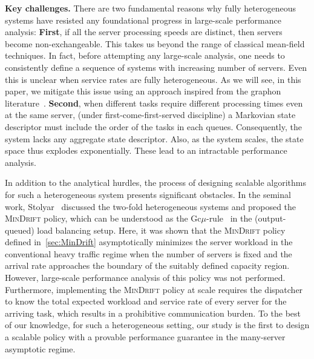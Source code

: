\documentclass[11pt, reqno]{article}
\numberwithin{equation}{section}
\numberwithin{theorem}{section}
\begin{document}
\noindent
\textbf{Key challenges.} 
There are two fundamental reasons why fully heterogeneous systems have resisted any foundational progress in large-scale performance analysis:
\textbf{First}, if all the server processing speeds are distinct, then servers become non-exchangeable.
This takes us beyond the range of classical mean-field techniques. In fact, before attempting any large-scale analysis, one needs to consistently define a sequence of systems with increasing number of servers. Even this is unclear when service rates are fully heterogeneous.
As we will see, in this paper, we mitigate this issue using an approach inspired from the graphon literature~\cite{ll12}.
\textbf{Second}, when different tasks require different processing times even at the same server,
(under first-come-first-served discipline) a Markovian state descriptor must include the order of the tasks in each queues. Consequently, the system lacks any aggregate state descriptor.
Also, as the system scales, the state space thus explodes exponentially. These lead to an intractable performance analysis.



In addition to the analytical hurdles, the process of designing scalable algorithms for such a heterogeneous system presents significant obstacles.
In the seminal work, Stolyar~\cite{AS05} discussed the two-fold heterogeneous systems and proposed the \textsc{MinDrift} policy, which can be understood as the Gc$\mu$-rule~\cite[Section~4]{MS04} in the (output-queued) load balancing setup. 
Here, it was shown that the \textsc{MinDrift} policy defined in~\ref{sec:MinDrift} asymptotically minimizes the server workload in the conventional heavy traffic regime when the number of servers is fixed and the arrival rate approaches the boundary of the suitably defined capacity region. 
However, large-scale performance analysis of this policy was not performed. 
Furthermore, implementing the \textsc{MinDrift} policy at scale requires the dispatcher to know the total expected workload and service rate of every server for the arriving task, which results in a prohibitive communication burden. 
To the best of our knowledge, for such a heterogeneous setting, our study is the first to design a scalable policy with a provable performance guarantee in the many-server asymptotic regime.\\
\end{document}

